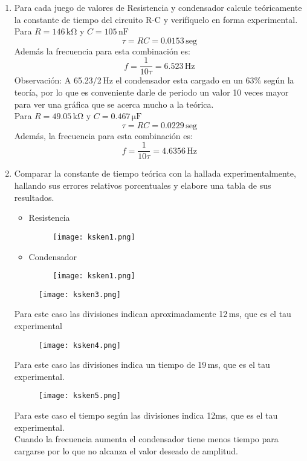 \documentclass[a4paper,12pt]{report}
\begin{document}
\begin{enumerate}
\item Para cada juego de valores de Resistencia y condensador calcule teóricamente la constante de tiempo del circuito R-C y verifíquelo en forma experimental.\\
Para $R = 146\,\mathrm{k\Omega}$ y $C = 105\,\mathrm{nF}$
$$
\tau = RC = 0.0153\,\mathrm{seg}
$$
Además la frecuencia para esta combinación es:
$$
f =  \frac{1}{10\tau}  =6.523\,\mathrm{Hz}
$$
Observación: A 65.23/2\,Hz el condensador esta cargado en un 63\% según la teoría, por lo que es conveniente darle de periodo un valor 10 veces mayor para ver una gráfica que se acerca mucho a la teórica.\\
Para $R = 49.05\,\mathrm{k\Omega}$ y $C = 0.467\,\mathrm{\mu F}$
$$
\tau = RC = 0.0229\,\mathrm{seg}
$$
Además, la frecuencia para esta combinación es:
$$
f =  \frac{1}{10\tau}  =4.6356\,\mathrm{Hz}
$$
\item Comparar la constante de tiempo teórica con la hallada experimentalmente, hallando sus errores relativos porcentuales y elabore una tabla de sus resultados.
\begin{itemize}
\item Resistencia
\begin{figure}[H]
\centering
\texttt{[image: ksken1.png]}
\end{figure}
\item Condensador
\begin{figure}[H]
\centering
\texttt{[image: ksken1.png]}
\end{figure}
\end{itemize}
\begin{figure}[H]
\centering
\texttt{[image: ksken3.png]}
\end{figure}
Para este caso las divisiones indican aproximadamente 12\,ms, que es el tau experimental
\begin{figure}[H]
\centering
\texttt{[image: ksken4.png]}
\end{figure}
Para este caso las divisiones indica un tiempo de 19\,ms, que es el tau experimental.
\begin{figure}[H]
\centering
\texttt{[image: ksken5.png]}
\end{figure}
Para este caso el tiempo según las divisiones indica 12ms, que es el tau experimental.\\
Cuando la frecuencia aumenta el condensador tiene menos tiempo para cargarse por lo que no alcanza el valor deseado de amplitud.\\

\end{enumerate}
\end{document}
